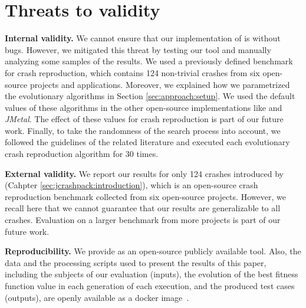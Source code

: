 \section{Threats to validity}
\label{sec:threats}


\textbf{Internal validity.}
We cannot ensure that our implementation of \botsing is without bugs. However, we mitigated this threat by testing our tool and manually analyzing some samples of the results. We used a previously defined benchmark for crash reproduction, which contains 124 non-trivial crashes from six open-source projects and applications.  Moreover, we explained how we parametrized the evolutionary algorithms in Section \ref{sec:approach:setup}. We used the default values of these algorithms in the other open-source implementations like \evosuite and \textit{JMetal}. The effect of these values for crash reproduction is part of our future work. Finally, to take the randomness of the search process into account, we followed the guidelines of the related literature \cite{Arcuri2014} and executed each evolutionary crash reproduction algorithm for 30 times.


\textbf{External validity.}
We report our results for only 124 crashes introduced by \crashpack (Cahpter \ref{sec:jcrashpack:introduction}), which is an open-source crash reproduction benchmark collected from six open-source projects. However, we recall here that we cannot guarantee that our results are generalizable to all crashes. Evaluation \moho on a larger benchmark from more projects is part of our future work.


\textbf{Reproducibility.}
We provide \botsing as an open-source publicly available tool. Also, the data and the processing scripts used to present the results of this paper, including the subjects of our evaluation (inputs), the evolution of the best fitness function value in each generation of each execution, and the produced test cases (outputs), are openly available as a docker image~\cite{zenodoRP}. 
